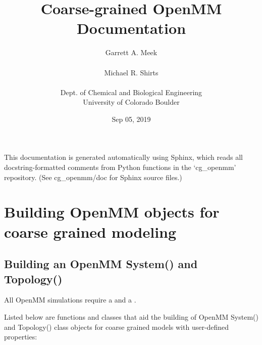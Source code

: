 \documentclass[letterpaper,12pt,english,openany,oneside]{sphinxmanual}
\title{Coarse-grained OpenMM Documentation}
\date{Sep 05, 2019}
\author{Garrett A. Meek\\ \\Michael R. Shirts\\ \\Dept. of Chemical and Biological Engineering\\University of Colorado Boulder}
\begin{document}
\pagestyle{empty}
\sphinxmaketitle
\pagestyle{plain}
\sphinxtableofcontents
\pagestyle{normal}
\label{\detokenize{index::doc}}


This documentation is generated automatically using Sphinx, which reads all docstring-formatted comments from Python functions in the ‘cg\_openmm’ repository.  (See cg\_openmm/doc for Sphinx source files.)


\chapter{Building OpenMM objects for coarse grained modeling}
\label{\detokenize{build:building-openmm-objects-for-coarse-grained-modeling}}\label{\detokenize{build::doc}}

\section{Building an OpenMM System() and Topology()}
\label{\detokenize{build:building-an-openmm-system-and-topology}}
All OpenMM simulations require a  and a .

Listed below are functions and classes that aid the building of OpenMM System() and Topology() class objects for coarse grained models with user-defined properties:

\label{\detokenize{build:module-build.cg_build}}
\end{document}
